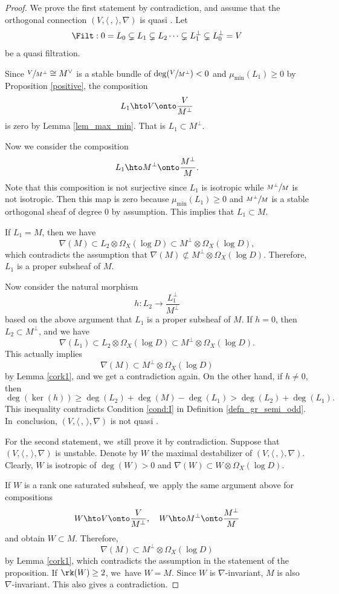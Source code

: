 \begin{proof}
We prove the first statement by contradiction, and assume that the orthogonal connection $(V,\langle \,, \, \rangle,\nabla)$ is quasi \grsemistable. Let
\[
\Filt: 0= L_0 \subsetneq L_1 \subsetneq L_2 \cdots \subsetneq L_1^\perp\subsetneq L_0^\perp= V
\]
be a quasi \grsemistable filtration.

Since $\sfrac{V}{M^\perp}\cong M^\vee$ is a stable bundle of $\deg(\sfrac{V}{M^\perp})<0$ and $\mu_{\min}(L_1)\geq 0$ by Proposition \ref{positive}, the composition
\[
L_1\hto V\onto \frac{V}{M^\perp}
\]
is zero by Lemma \ref{lem_max_min}. That is $L_1\subset M^\perp$.

Now we consider the composition
\[
L_1\hto M^\perp\onto \frac{M^\perp}{M}.
\]
Note that this composition is not surjective since $L_1$ is isotropic while $\sfrac{M^\perp}{M}$ is not isotropic. Then this map is zero because $\mu_{\min}(L_1)\geq 0$ and $\sfrac{M^\perp}{M}$ is a stable orthogonal sheaf of degree $0$ by assumption. This implies that $L_1\subset M$.

If $L_1=M$, then we have
\[
\nabla(M)\subset L_2\otimes \Omega_X(\log D)\subset M^\perp\otimes \Omega_X(\log D),
\]
which contradicts the assumption that $\nabla(M)\not \subset M^\perp\otimes\Omega_X(\log D)$. Therefore, $L_1$ is a proper subsheaf of $M$.

Now consider the natural morphism
\[
h: L_2\to \frac{L_1^\perp}{M^\perp}
\]
based on the above argument that $L_1$ is a proper subsheaf of $M$. If $h=0$, then $L_2\subset M^\perp$, and we have
\[
\nabla(L_1)\subset L_2\otimes \Omega_X(\log D)\subset M^\perp\otimes \Omega_X(\log D).
\]
This actually implies
\[
\nabla(M) \subset M^\perp\otimes\Omega_X(\log D)
\]
by Lemma \ref{cork1}, and we get a contradiction again. On the other hand, if $h\neq 0$, then
\[
\deg(\ker(h))\geq \deg(L_2)+\deg(M)-\deg(L_1)> \deg(L_2)+\deg(L_1).
\]
This inequality contradicts Condition \eqref{cond:I} in Definition \ref{defn_gr_semi_odd}. In~conclusion, $(V, \langle \,, \, \rangle, \nabla)$ is not quasi \grsemistable.

For the second statement, we~still prove it by contradiction. Suppose that $(V, \langle \,, \, \rangle, \nabla)$ is unstable. Denote by $W$ the maximal destabilizer of $(V, \langle \,, \, \rangle, \nabla)$. Clearly, $W$ is isotropic of $\deg(W)>0$ and $\nabla(W)\subset W\otimes \Omega_X(\log D)$.

If $W$ is a rank one saturated subsheaf, we~apply the same argument above for compositions
\begin{align*}
W \hto V \onto \frac{V}{M^{\perp}}, \quad W \hto M^\perp\onto \frac{M^\perp}{M}
\end{align*}
and obtain $W \subset M$. Therefore,
\[
\nabla(M)\subset M^\perp\otimes\Omega_X(\log D)
\]
by Lemma \ref{cork1}, which contradicts the assumption in the statement of the proposition. If $\rk(W)\geq 2$, we~have $W= M$. Since $W$ is $\nabla$-invariant, $M$ is also $\nabla$-invariant. This also gives a contradiction.


\end{proof}

